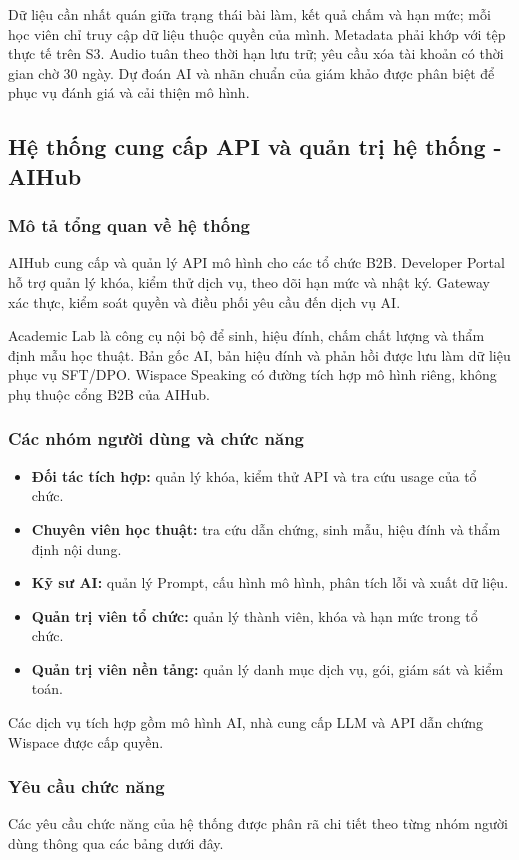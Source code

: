 Dữ liệu cần nhất quán giữa trạng thái bài làm, kết quả chấm và hạn mức; mỗi học viên chỉ truy cập dữ liệu thuộc quyền của mình. Metadata phải khớp với tệp thực tế trên S3. Audio tuân theo thời hạn lưu trữ; yêu cầu xóa tài khoản có thời gian chờ 30 ngày. Dự đoán AI và nhãn chuẩn của giám khảo được phân biệt để phục vụ đánh giá và cải thiện mô hình.

\subsection{Hệ thống cung cấp API và quản trị hệ thống - AIHub}
\label{subsec:aihub_system_spec}

\subsubsection{Mô tả tổng quan về hệ thống}
AIHub cung cấp và quản lý API mô hình cho các tổ chức B2B. Developer Portal hỗ trợ quản lý khóa, kiểm thử dịch vụ, theo dõi hạn mức và nhật ký. Gateway xác thực, kiểm soát quyền và điều phối yêu cầu đến dịch vụ AI.

Academic Lab là công cụ nội bộ để sinh, hiệu đính, chấm chất lượng và thẩm định mẫu học thuật. Bản gốc AI, bản hiệu đính và phản hồi được lưu làm dữ liệu phục vụ SFT/DPO. Wispace Speaking có đường tích hợp mô hình riêng, không phụ thuộc cổng B2B của AIHub.

\subsubsection{Các nhóm người dùng và chức năng}
\begin{itemize}
\item \textbf{Đối tác tích hợp:} quản lý khóa, kiểm thử API và tra cứu usage của tổ chức.
\item \textbf{Chuyên viên học thuật:} tra cứu dẫn chứng, sinh mẫu, hiệu đính và thẩm định nội dung.
\item \textbf{Kỹ sư AI:} quản lý Prompt, cấu hình mô hình, phân tích lỗi và xuất dữ liệu.
\item \textbf{Quản trị viên tổ chức:} quản lý thành viên, khóa và hạn mức trong tổ chức.
\item \textbf{Quản trị viên nền tảng:} quản lý danh mục dịch vụ, gói, giám sát và kiểm toán.
\end{itemize}
Các dịch vụ tích hợp gồm mô hình AI, nhà cung cấp LLM và API dẫn chứng Wispace được cấp quyền.

\subsubsection{Yêu cầu chức năng}
Các yêu cầu chức năng của hệ thống được phân rã chi tiết theo từng nhóm người dùng thông qua các bảng dưới đây.

